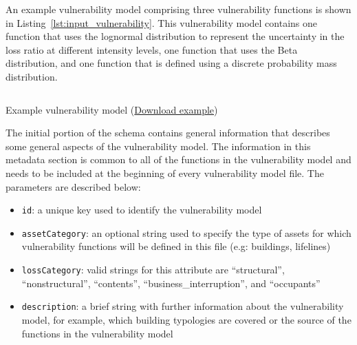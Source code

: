 An example \gls{vulnerability model} comprising three \glspl{vulnerability
function} is shown in Listing~\ref{lst:input_vulnerability}. This
\gls{vulnerability model} contains one function that uses the lognormal
distribution to represent the uncertainty in the loss ratio at different
intensity levels, one function that uses the Beta distribution, and one
function that is defined using a discrete probability mass distribution.

\begin{listing}[htbp]
  \inputminted[firstline=1,firstnumber=1,fontsize=\footnotesize,frame=single,linenos,bgcolor=lightgray]{xml}{oqum/risk/Verbatim/input_vulnerability.xml}
  \caption{Example vulnerability model (\href{https://raw.githubusercontent.com/GEMScienceTools/oq-engine-docs/master/oqum/risk/verbatim/input_vulnerability.xml}{Download example})}
  \label{lst:input_vulnerability}
\end{listing}


The initial portion of the schema contains general information that describes
some general aspects of the \gls{vulnerability model}. The information in this
metadata section is common to all of the functions in the \gls{vulnerability
model} and needs to be included at the beginning of every \gls{vulnerability
model} file. The parameters are described below:

\begin{itemize}

    \item \Verb+id+: a unique key used to identify the \gls{vulnerability model}

    \item \Verb+assetCategory+: an optional string used to specify the type of
    \glspl{asset} for which \glspl{vulnerability function} will be defined in this file 
    (e.g: buildings, lifelines)

    \item \Verb+lossCategory+: valid strings for this attribute are 
    ``structural'', ``nonstructural'', ``contents'',  
    ``business\_interruption'', and ``occupants''

    \item \Verb+description+: a brief string with further information about the
    \gls{vulnerability model}, for example, which building typologies are 
    covered or the source of the functions in the \gls{vulnerability model}

\end{itemize}

